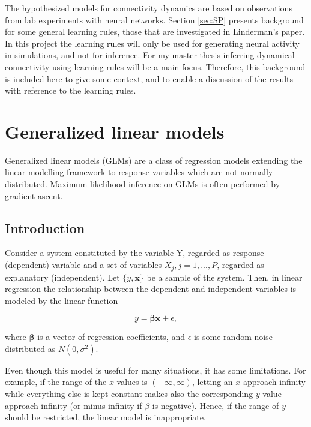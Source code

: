 The hypothesized models for connectivity dynamics are based on observations from lab experiments with neural networks. Section \ref{sec:SP} presents background for some general learning rules, those that are investigated in Linderman's paper. In this project the learning rules will only be used for generating neural activity in simulations, and not for inference. For my master thesis inferring dynamical connectivity using learning rules will be a main focus. Therefore, this background is included here to give some context, and to enable a discussion of the results with reference to the learning rules.

\section{Generalized linear models}
\label{sec:stats}

Generalized linear models (GLMs) are a class of regression models extending the linear modelling framework to response variables which are not normally distributed. Maximum likelihood inference on GLMs is often performed by gradient ascent.

\subsection{Introduction}
\label{Intro_GLM}
Consider a system constituted by the variable Y, regarded as response (dependent) variable and a set of variables ${X_j}, {j=1,...,P}$, regarded as explanatory (independent). Let $\{y,\mathbf{x}\}$ be a sample of the system. Then, in linear regression the relationship between the dependent and independent variables is modeled by the linear function

\begin{equation}
\label{eq:general}
    y = \bm{ \beta} \mathbf{x} + \epsilon,
\end{equation}

where $\bm{\beta}$ is a vector of regression coefficients, and $\epsilon$ is some random noise distributed as $N(0, \sigma^{2})$. 

Even though this model is useful for many situations, it has some limitations. For example, if the range of the $x$-values is $(-\infty, \infty)$, letting an $x$ approach infinity while everything else is kept constant makes also the corresponding $y$-value approach infinity (or minus infinity if $\beta$ is negative). Hence, if the range of $y$ should be restricted, the linear model is inappropriate. 

